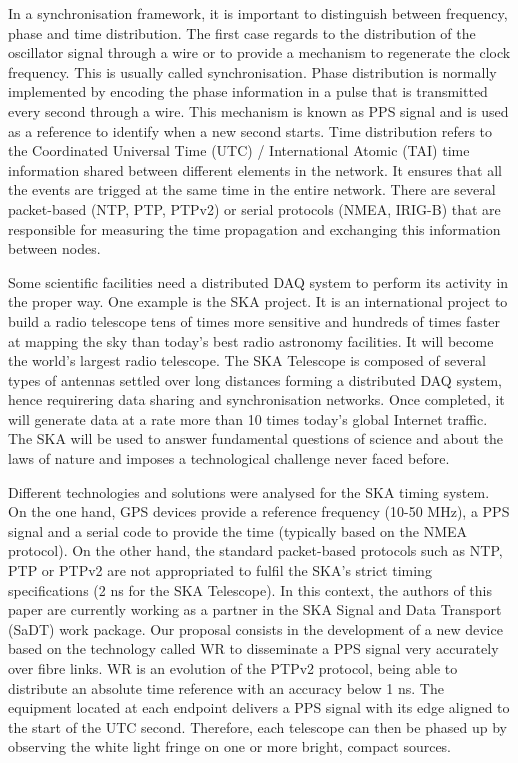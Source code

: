 In a synchronisation framework, it is important to distinguish between frequency, phase and time distribution.
The first case regards to the distribution of the oscillator signal through a wire or to provide a mechanism to regenerate the clock frequency. This is usually  called synchronisation. Phase distribution is normally implemented by encoding the phase information in a pulse that is transmitted every second through a wire. This mechanism is known as PPS signal and is used as a reference to identify when a new second starts.
Time distribution refers to the Coordinated Universal Time (UTC) / International Atomic (TAI) time information shared between different elements in the network. It ensures that all the events are trigged at the same time in the entire network. There are several packet-based (NTP, PTP, PTPv2) or serial protocols (NMEA, IRIG-B) that are responsible for measuring the time propagation and exchanging this information between nodes. 

Some scientific facilities need a distributed DAQ system to perform its activity in the proper way. One example is the SKA \cite{ska:project_website} project. It is an international project to build a radio telescope tens of times more sensitive and hundreds of times faster at mapping the sky than today's best radio astronomy facilities. It will become the world's largest radio telescope. The SKA Telescope is composed of several types of antennas settled over long distances forming a distributed DAQ system, hence requirering  data sharing and synchronisation networks. Once completed, it will generate data at a rate more than 10 times today's global Internet traffic. The SKA will be used to answer fundamental questions of science and about the laws of nature and imposes a technological challenge never faced before.

Different technologies and solutions were analysed for the SKA timing system. On the one hand, GPS devices provide a reference frequency (10-50 MHz), a PPS signal and a serial code to provide the time (typically based on the NMEA protocol). On the other hand, the standard packet-based protocols such as NTP, PTP or PTPv2 are not appropriated to fulfil the SKA's strict timing specifications (2 ns for the SKA Telescope).
In this context, the authors of this paper are currently working as a partner in the SKA Signal and Data Transport (SaDT) \cite{ska:sadt_website} work package. Our proposal consists in the development of a new device based on the technology called WR \cite{ohwr:wr_wiki} to disseminate a PPS signal very accurately over fibre links. WR is an evolution of the PTPv2 protocol, being able to distribute an absolute time reference with an accuracy below 1 ns. The equipment located at each endpoint delivers a PPS signal with its edge aligned to the start of the UTC second. Therefore, each telescope can then be phased up by observing the white light fringe on one or more bright, compact sources.

